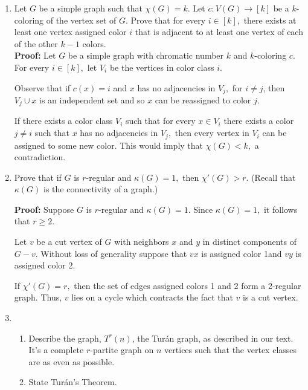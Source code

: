 \documentclass[12pt]{article}
\begin{document}
\begin{enumerate}

\item Let $G$ be a simple graph such that  $\chi(G)=k.$ Let $c: V(G) \to [k]$ be a $k$-coloring of the vertex set of $G.$ Prove that for every $i \in [k],$ there exists at least one vertex assigned color $i$ that is adjacent to at least one vertex of each of the other $k-1$ colors.\\

\textbf{Proof:} Let $G$ be a simple graph with chromatic number $k$ and $k$-coloring $c.$ For every $ i \in [k],$ let $V_i$ be the vertices in color class $i.$

Observe that if $c(x)=i$ and $x$ has no adjacencies in $V_j,$ for $i \not = j$, then $V_j \cup x$ is an independent set and so $x$ can be reassigned to color $j.$ 

If there exists a color class $V_i$ such that for every $x \in V_i$ there exists a color $j\not = i$ such that $x$ has no adjacencies in $V_j,$ then every vertex in $V_i$ can be assigned to some new color. This would imply that $\chi(G) < k,$ a contradiction. 



\item Prove that if $G$ is $r$-regular and $\kappa(G)=1,$ then $\chi'(G) > r.$ (Recall that $\kappa(G)$ is the connectivity of a graph.)

\textbf{Proof:} Suppose $G$ is $r$-regular and $\kappa(G)=1.$ Since $\kappa(G)=1,$ it follows that $r\geq 2.$

Let $v$ be a cut vertex of $G$ with neighbors $x$ and $y$ in distinct components of $G-v.$ Without loss of generality suppose that $vx$ is assigned color 1and $vy$ is assigned color 2.

 If $\chi'(G)=r,$ then the set of edges assigned colors 1 and 2 form a 2-regular graph. Thus, $v$ lies on a cycle which contracts the fact that $v$ is a cut vertex.

\item 
	\begin{enumerate}
	\item Describe the graph, $T^r(n)$, the Tur\'{a}n graph, as described in our text.\\
	
	It's a complete $r$-partite graph on $n$ vertices such that the vertex classes are as even as possible.\\
	
	\item State Tur\'{a}n's Theorem.
	

\end{enumerate}
\end{enumerate}
\end{document}
